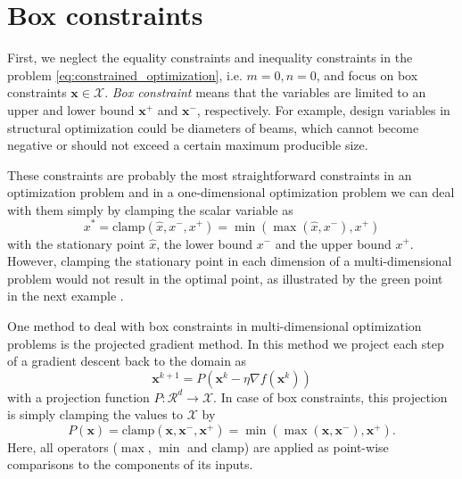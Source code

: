 \section{Box constraints} 
First, we neglect the equality constraints and inequality constraints in the problem \eqref{eq:constrained_optimization}, i.e. $m=0, n=0$, and focus on box constraints $\mathbf{x} \in \mathcal{X}$. \emph{Box constraint} means that the variables are limited to an upper and lower bound $\mathbf{x}^+$ and $\mathbf{x}^-$, respectively. For example, design variables in structural optimization could be diameters of beams, which cannot become negative or should not exceed a certain maximum producible size.

These constraints are probably the most straightforward constraints in an optimization problem and in a one-dimensional optimization problem we can deal with them simply by clamping the scalar variable as 
\begin{equation}
    x^* = \textrm{clamp}(\hat{x}, x^-, x^+) = \min(\max(\hat{x}, x^-), x^+)
\end{equation}
with the stationary point $\hat{x}$, the lower bound $x^-$ and the upper bound $x^+$. 
However, clamping the stationary point in each dimension of a multi-dimensional problem would not result in the optimal point, as illustrated by the green point in the next example \cite{Niculae2020}.

One method to deal with box constraints in multi-dimensional optimization problems is the projected gradient method. In this method we project each step of a gradient descent back to the domain as 
\begin{equation}
    \mathbf{x}^{k+1} = P(\mathbf{x}^k -\eta \nabla f(\mathbf{x}^k))
\end{equation}
with a projection function $P: \mathcal{R}^d \rightarrow \mathcal{X}$. In case of box constraints, this projection is simply clamping the values to $\mathcal{X}$ by 
\begin{equation}
    P(\mathbf{x}) = \textrm{clamp}(\mathbf{x}, \mathbf{x}^-, \mathbf{x}^+) = \min(\max(\mathbf{x}, \mathbf{x}^-), \mathbf{x}^+).
\end{equation}
Here, all operators ($\max$, $\min$ and $\textrm{clamp}$) are applied as point-wise comparisons to the components of its inputs.

